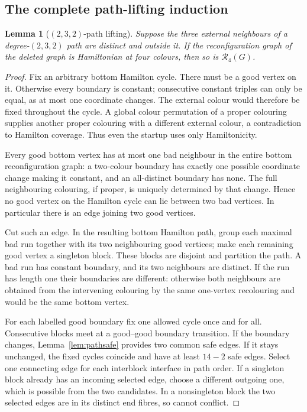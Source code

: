 \documentclass[11pt]{article}
\newtheorem{lemma}[theorem]{Lemma}
\theoremstyle{remark}
\newcommand{\R}{\mathcal R}
\numberwithin{equation}{section}
\begin{document}
\subsection{The complete path-lifting induction}
\begin{lemma}[$(2,3,2)$-path lifting]\label{lem:path232}
Suppose the three external neighbours of a degree-$(2,3,2)$ path are
distinct and outside it. If the reconfiguration graph of the deleted
graph is Hamiltonian at four colours, then so is $\R_4(G)$.
\end{lemma}
\begin{proof}
Fix an arbitrary bottom Hamilton cycle. There must be a good vertex
on it. Otherwise every boundary is constant; consecutive constant
triples can only be equal, as at most one coordinate changes. The
external colour would therefore be fixed throughout the cycle. A
global colour permutation of a proper colouring supplies another
proper colouring with a different external colour, a contradiction
to Hamilton coverage. Thus even the startup uses only Hamiltonicity.

Every good bottom vertex has at most one bad neighbour in the entire
bottom reconfiguration graph: a two-colour boundary has exactly one
possible coordinate change making it constant, and an all-distinct
boundary has none. The full neighbouring colouring, if proper, is
uniquely determined by that change. Hence no good vertex on the
Hamilton cycle can lie between two bad vertices. In particular there
is an edge joining two good vertices.

Cut such an edge. In the resulting bottom Hamilton path, group each
maximal bad run together with its two neighbouring good vertices;
make each remaining good vertex a singleton block. These blocks are
disjoint and partition the path. A bad run has constant boundary,
and its two neighbours are distinct. If the run has length one their
boundaries are different: otherwise both neighbours are obtained from
the intervening colouring by the same one-vertex recolouring and
would be the same bottom vertex.

For each labelled good boundary fix one allowed cycle once and for
all. Consecutive blocks meet at a good--good boundary transition.
If the boundary changes, Lemma~\ref{lem:pathsafe} provides two common
safe edges. If it stays unchanged, the fixed cycles coincide and
have at least $14-2$ safe edges. Select one connecting edge for each
interblock interface in path order. If a singleton block already has
an incoming selected edge, choose a different outgoing one, which is
possible from the two candidates. In a nonsingleton block the two
selected edges are in its distinct end fibres, so cannot conflict.


\end{proof}
\end{document}
